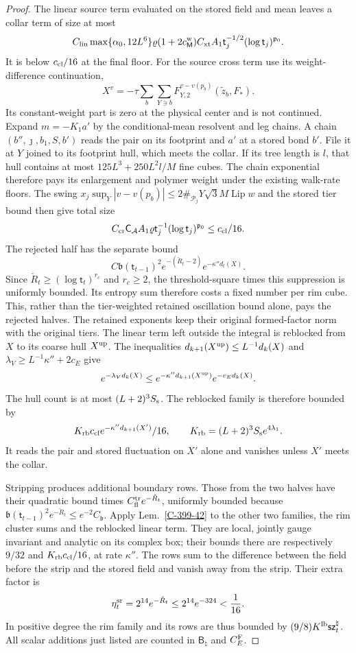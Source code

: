 \documentclass[11pt,letterpaper,reqno]{amsart}
\theoremstyle{definition}
\theoremstyle{remark}
\begin{document}
\begin{proof}
The linear source term evaluated on the stored field
and mean leaves a collar term of size at most
\[
 C_{\rm lin}\max\{\alpha_0,12L^6\}\varrho
 (1+2c_{\mathsf M}^{\rm w})C_{\rm xt}A_1
 \mathsf t_j^{-1/2}(\log\mathsf t_j)^{\mathfrak p_0}.
\]
It is below $c_{\rm cl}/16$ at the final floor. For the
source cross term use its weight-difference continuation,
\[
 X^v=-\tau\sum_b\sum_{Y\ni b}
                  F_{Y,2}^{v-v(p_b)}(\widetilde z_b,F_*).
\]
Its constant-weight part is zero at the physical center
and is not continued. Expand $m=-K_1a'$ by the
conditional-mean resolvent and leg chains. A chain
$(b'',\jmath,b_1,S,b')$ reads the pair on its footprint
and $a'$ at a stored bond $b'$. File it at $Y$ joined
to its footprint hull, which meets the collar.
If its tree length is $l$, that hull contains at most
$125L^3+250L^2l/M$ fine cubes. The chain exponential
therefore pays its enlargement and polymer weight under
the existing walk-rate floors. The swing
$x_j\sup_Y|v-v(p_b)|\le2\#_{\mathcal P_j}Y\sqrt3M\operatorname{Lip}w$
and the stored tier bound then give total size
\[
 C_{\rm cr}\mathsf C_{\mathcal A}A_1\varrho
       \mathsf t_j^{-1}(\log\mathsf t_j)^{\mathfrak p_0}
 \le c_{\rm cl}/16.
\]
The rejected half has the separate bound
\[
 C\mathfrak b(\mathsf t_{t-1})^2
 e^{-(\check R_t-2)}e^{-\kappa''d_t(X)}.
\]
Since $\check R_t\ge(\log\mathsf t_t)^{r_c}$ and
$r_c\ge2$, the threshold-square times this suppression
is uniformly bounded. Its entropy sum therefore costs
a fixed number per rim cube. This, rather than the
tier-weighted retained oscillation bound alone, pays
the rejected halves. The retained exponents keep their
original formed-factor norm with the original tiers.
The linear term left outside the integral is reblocked from
$X$ to its coarse hull $X^{\rm up}$. The inequalities
$d_{k+1}(X^{\rm up})\le L^{-1}d_k(X)$ and
$\lambda_V\ge L^{-1}\kappa''+2c_E$ give
\[
 e^{-\lambda_Vd_k(X)}
 \le e^{-\kappa''d_{k+1}(X^{\rm up})}e^{-c_Ed_k(X)}.
\]
The hull count is at most $(L+2)^3S_{\rm s}$. The reblocked
family is therefore bounded by
\[
 K_{\rm rb}c_{\rm cl}e^{-\kappa''d_{k+1}(X')}/16,
 \qquad K_{\rm rb}=(L+2)^3S_{\rm s}e^{4\lambda_1}.
\]
It reads the pair and stored fluctuation on $X'$ alone and
vanishes unless $X'$ meets the collar.

Stripping produces additional boundary rows. Those from the
two halves have their quadratic bound times
$C_{\rm fl}^{\rm tr}e^{-\check R_t}$, uniformly bounded because
$\mathfrak b(\mathsf t_{t-1})^2e^{-\check R_t}
\le e^{-2}C_{\mathfrak b}$. Apply Lem.~\ref{C-399-42} to the
other two families, the rim cluster sums and the reblocked
linear term. They are local, jointly gauge invariant and
analytic on its complex box; their bounds there are respectively
$9/32$ and $K_{\rm rb}c_{\rm cl}/16$, at rate $\kappa''$.
The rows sum to the difference between the field before the
strip and the stored field and vanish away from the strip.
Their extra factor is
\[
 \eta_t^{\rm sr}=2^{14}e^{-\check R_t}
       \le2^{14}e^{-324}<\frac1{16}.
\]
In positive degree the rim family and its rows are thus bounded
by $(9/8)K^{\rm lb}\mathsf{sz}_t^\natural$.
All scalar additions just listed are counted in
$\mathsf B_\natural$ and $C_E^{\rm F}$.


\end{proof}
\end{document}
